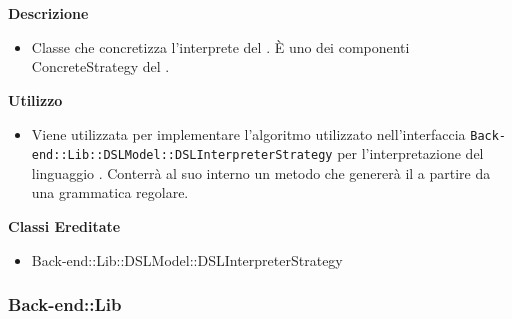         \textbf{\\ \\ Descrizione} 
          \begin{itemize}
            \item[] Classe che concretizza l'interprete del . È uno dei componenti ConcreteStrategy del  .
          \end{itemize}      
        \textbf{Utilizzo}  
          \begin{itemize}
            \item[] Viene utilizzata per implementare l'algoritmo utilizzato nell'interfaccia \texttt{Back-end::Lib::DSLModel::DSLInterpreterStrategy} per l'interpretazione del linguaggio . Conterrà al suo interno un metodo che genererà il  a partire da una grammatica regolare.
          \end{itemize}
          \textbf{Classi Ereditate}
          \begin{itemize}
                \item{Back-end::Lib::DSLModel::DSLInterpreterStrategy}
          \end{itemize}
  \subsubsection{Back-end::Lib}
